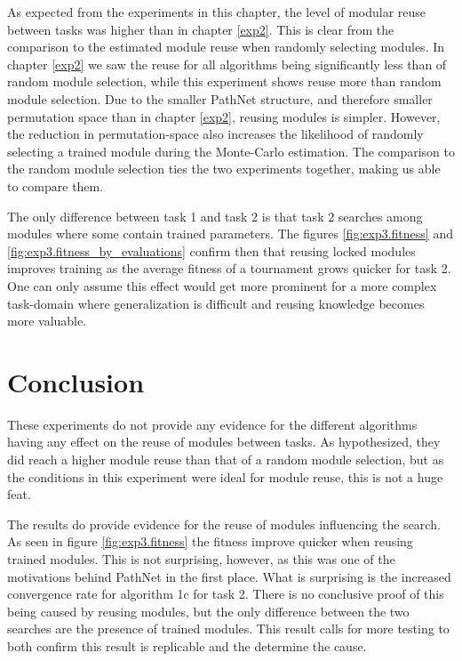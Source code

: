 As expected from the experiments in this chapter, the level of modular reuse between tasks was higher than in chapter \ref{exp2}. This is clear from the comparison to the estimated module reuse when randomly selecting modules. In chapter \ref{exp2} we saw the reuse for all algorithms being significantly less than of random module selection, while this experiment shows reuse more than random module selection. Due to the smaller PathNet structure, and therefore smaller permutation space than in chapter \ref{exp2}, reusing modules is simpler. However, the reduction in permutation-space also increases the likelihood of randomly selecting a trained module during the Monte-Carlo estimation. The comparison to the random module selection ties the two experiments together, making us able to compare them. 

The only difference between task 1 and task 2 is that task 2 searches among modules where some contain trained parameters. The figures \ref{fig:exp3.fitness} and \ref{fig:exp3.fitness_by_evaluations} confirm then that reusing locked modules improves training as the average fitness of a tournament grows quicker for task 2. One can only assume this effect would get more prominent for a more complex task-domain where generalization is difficult and reusing knowledge becomes more valuable. 

\section{Conclusion}
These experiments do not provide any evidence for the different algorithms having any effect on the reuse of modules between tasks. As hypothesized, they did reach a higher module reuse than that of a random module selection, but as the conditions in this experiment were ideal for module reuse, this is not a huge feat.

The results do provide evidence for the reuse of modules influencing the search. As seen in figure \ref{fig:exp3.fitness} the fitness improve quicker when reusing trained modules. This is not surprising, however, as this was one of the motivations behind PathNet in the first place. What is surprising is the increased convergence rate for algorithm 1c for task 2. There is no conclusive proof of this being caused by reusing modules, but the only difference between the two searches are the presence of trained modules. This result calls for more testing to both confirm this result is replicable and the determine the cause. 